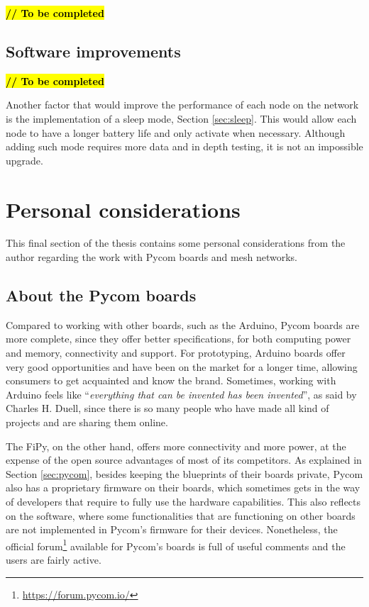 			\textbf{\textcolor{red}{\hl{// To be completed}}}

		\subsection{Software improvements}\label{sec:software_improvements}
		
			\textbf{\textcolor{red}{\hl{// To be completed}}}
		
%			

			Another factor that would improve the performance of each node on the network is the implementation of a sleep mode, Section \ref{sec:sleep}.
			This would allow each node to have a longer battery life and only activate when necessary.
			Although adding such mode requires more data and in depth testing, it is not an impossible upgrade.

	\section{Personal considerations}
	
		This final section of the thesis contains some personal considerations from the author regarding the work with Pycom boards and mesh networks.
	
		\subsection{About the Pycom boards}\label{sec:working_with_pycom}
		
			Compared to working with other boards, such as the Arduino, Pycom boards are more complete, since they offer better specifications, for both computing power and memory, connectivity and support.			
			For prototyping, Arduino boards offer very good opportunities and have been on the market for a longer time, allowing consumers to get acquainted and know the brand.
			Sometimes, working with Arduino feels like ``\textit{everything that can be invented has been invented}'', as said by Charles H. Duell, since there is so many people who have made all kind of projects and are sharing them online.
			
			The FiPy, on the other hand, offers more connectivity and more power, at the expense of the open source advantages of most of its competitors.
			As explained in Section \ref{sec:pycom}, besides keeping the blueprints of their boards private, Pycom also has a proprietary firmware on their boards, which sometimes gets in the way of developers that require to fully use the hardware capabilities.
			This also reflects on the software, where some functionalities that are functioning on other boards are not implemented in Pycom's firmware for their devices.
			Nonetheless, the official forum\footnote{ \url{https://forum.pycom.io/}} available for Pycom's boards is full of useful comments and the users are fairly active.
			
